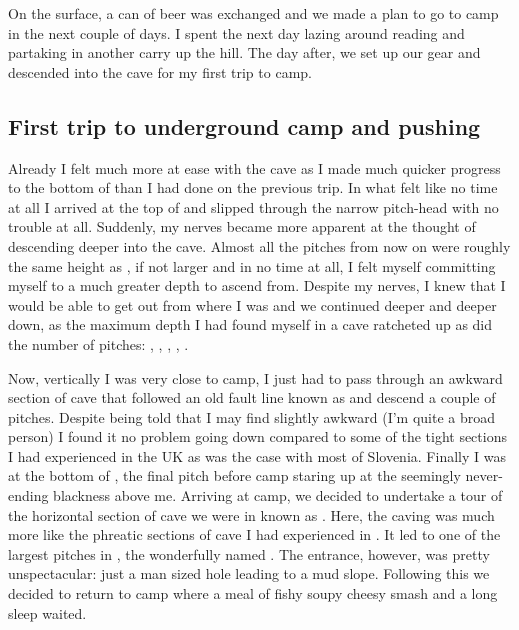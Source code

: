 On the surface, a can of beer was exchanged and we made a plan to go to
camp in the next couple of days. I spent the next day lazing around
reading and partaking in another carry up the hill. The day after, we
set up our gear and descended into the cave for my first trip to camp.

\subsection{First trip to underground camp and pushing}

Already I felt much more at ease with the cave as I made much quicker
progress to the bottom of  than I had done on the previous trip. In
what felt like no time at all I arrived at the top of 
and slipped through the narrow pitch-head with no trouble at all.
Suddenly, my nerves became more apparent at the thought of descending
deeper into the cave. Almost all the pitches from now on were roughly
the same height as , if not larger and in no time at all, I felt
myself committing myself to a much greater depth to ascend from. Despite
my nerves, I knew that I would be able to get out from where I was and
we continued deeper and deeper down, as the maximum depth I had found
myself in a cave ratcheted up as did the number of pitches:
, , , ,
.


Now, vertically I was very close to camp, I just had
to pass through an awkward section of cave that followed an old fault
line known as  and descend a couple of pitches. Despite being
told that I may find  slightly awkward (I'm quite a broad
person) I found it no problem going down compared to some of the tight
sections I had experienced in the UK as was the case with most of
Slovenia. Finally I was at the bottom of , the final pitch
before camp staring up at the seemingly never-ending blackness above me.
Arriving at camp, we decided to undertake a tour of the horizontal
section of cave we were in known as . Here, the
caving was much more like the phreatic sections of cave I had
experienced in . It led to one of the largest pitches in
, the wonderfully named .
The entrance, however, was pretty unspectacular: just a man sized hole
leading to a mud slope. Following this we decided to return to camp
where a meal of fishy soupy cheesy smash and a long sleep waited.

